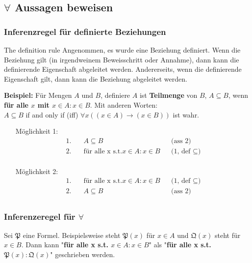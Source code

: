 \subsection{$\forall$ Aussagen beweisen}
\subsubsection*{Inferenzregel für definierte Beziehungen}

{
    The definition rule 
}
{
    Angenommen, es wurde eine Beziehung definiert. Wenn die Beziehung gilt (in irgendweinem Beweisschritt oder Annahme), dann kann die definierende Eigenschaft abgeleitet werden. Andererseits, wenn die definierende Eigenschaft gilt, dann kann die Beziehung abgeleitet werden.
}

\textbf{Beispiel: } Für Mengen $A$ und $B$, definiere $A$ ist \textbf{Teilmenge} von $B$, $A \subseteq B$, wenn \textbf{für alle $x$ mit $x \in A : x \in B$}. Mit anderen Worten: \\ $A \subseteq B$ if and only if (iff) $\forall x ((x \in A) \rightarrow (x \in B))$ ist wahr.
\begin{itemize}
    \item [Möglichkeit 1:]
        \begin{align*}
            1. &\quad A \subseteq B                   && \text{(ass 2)} \\
            2. &\quad \text{für alle x s.t.} x \in A : x \in B                      && \text{(1, def $\subseteq$)} \\
        \end{align*}
    \item [Möglichkeit 2:]
        \begin{align*}
            1. &\quad \text{für alle x s.t.} x \in A : x \in B                      && \text{(1, def $\subseteq$)} \\
            2. &\quad A \subseteq B                   && \text{(ass 2)} \\
        \end{align*}
\end{itemize}

\subsubsection*{Inferenzeregel für $\forall$}
Sei $\mathfrak{P} $ eine Formel. Beispielsweise steht $\mathfrak{P}(x)$ für $x \in A$ und $\mathfrak{Q}(x)$ steht für $x \in B$. Dann kann "\textbf{für alle x s.t. $x \in A: x \in B$}" als "\textbf{für alle x s.t. $\mathfrak{P}(x) : \mathfrak{Q}(x)$}" geschrieben werden.

